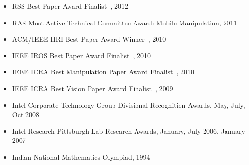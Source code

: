 \begin{itemize}
\item RSS Best Paper Award Finalist~\cite{dragan2012formalizing}, 2012
\item RAS Most Active Technical Committee Award: Mobile Manipulation, 2011 
\item ACM/IEEE HRI Best Paper Award Winner~\cite{lee2010gracefully}, 2010
\item IEEE IROS Best Paper Award Finalist~\cite{dogar2010pushgrasp}, 2010
\item IEEE ICRA Best Manipulation Paper Award Finalist~\cite{chang2010pregrasp}, 2010
\item IEEE ICRA Best Vision Paper Award Finalist~\cite{collet2009object}, 2009
\item Intel Corporate Technology Group Divisional Recognition Awards, May, July, Oct 2008
\item Intel Research Pittsburgh Lab Research Awards, January, July 2006, January 2007
\item Indian National Mathematics Olympiad, 1994
\end{itemize}

